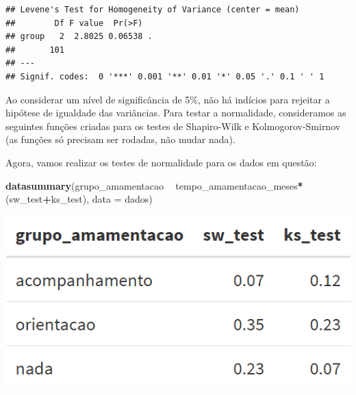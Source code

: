 \documentclass[
]{book}
\newenvironment{Shaded}{\begin{snugshade}}{\end{snugshade}}
\newcommand{\CommentTok}[1]{\textcolor[rgb]{0.56,0.35,0.01}{\textit{#1}}}
\newcommand{\ControlFlowTok}[1]{\textcolor[rgb]{0.13,0.29,0.53}{\textbf{#1}}}
\newcommand{\DataTypeTok}[1]{\textcolor[rgb]{0.13,0.29,0.53}{#1}}
\newcommand{\KeywordTok}[1]{\textcolor[rgb]{0.13,0.29,0.53}{\textbf{#1}}}
\newcommand{\NormalTok}[1]{#1}
\newcommand{\OperatorTok}[1]{\textcolor[rgb]{0.81,0.36,0.00}{\textbf{#1}}}
\newcommand{\StringTok}[1]{\textcolor[rgb]{0.31,0.60,0.02}{#1}}
\begin{document}
\begin{verbatim}
## Levene's Test for Homogeneity of Variance (center = mean)
##        Df F value  Pr(>F)  
## group   2  2.8025 0.06538 .
##       101                  
## ---
## Signif. codes:  0 '***' 0.001 '**' 0.01 '*' 0.05 '.' 0.1 ' ' 1
\end{verbatim}

Ao considerar um nível de significância de 5\%, não há indícios para rejeitar a hipótese de igualdade das variâncias. Para testar a normalidade, consideramos as seguintes funções criadas para os testes de Shapiro-Wilk e Kolmogorov-Smirnov (as funções só precisam ser rodadas, não mudar nada).

\begin{Shaded}
\end{Shaded}

Agora, vamos realizar os testes de normalidade para os dados em questão:

\begin{Shaded}
\begin{Highlighting}[]
\KeywordTok{datasummary}\NormalTok{(grupo_amamentacao }\OperatorTok{~}\StringTok{ }\NormalTok{tempo_amamentacao_meses}\OperatorTok{*}\NormalTok{(sw_test}\OperatorTok{+}\NormalTok{ks_test),}
            \DataTypeTok{data =}\NormalTok{ dados)}
\end{Highlighting}
\end{Shaded}

\includegraphics[width=1\linewidth]{figures/normalidade_amament}
\end{document}
